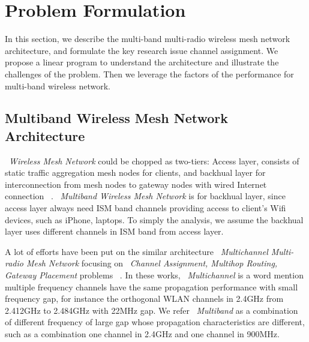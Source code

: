\section{Problem Formulation}
\label{sec:problemformulation}


In this section, we describe the multi-band multi-radio wireless mesh network architecture, and formulate the key research issue channel assignment. 
We propose a linear program to understand the architecture and illustrate the challenges of the problem.
Then we leverage the factors of the performance for multi-band wireless network.
 
\subsection{Multiband Wireless Mesh Network Architecture}
\label{subsec:architecture}
~\emph{Wireless Mesh Network} could be chopped as two-tiers:
Access layer, consists of static traffic aggregation mesh nodes for clients, and backhual layer for interconnection from mesh nodes to gateway nodes with wired Internet connection ~\cite{akyildiz2005wireless}. 
~\emph{Multiband Wireless Mesh Network} is for backhual layer, since access layer always need ISM band channels providing access to client's Wifi devices, such as iPhone, laptops. To simply the analysis, we assume the backhual layer uses different channels in ISM band from access layer.

A lot of efforts have been put on the similar architecture ~\emph{Multichannel Multi-radio Mesh Network} focusing on ~\emph{Channel Assignment, Multihop Routing, Gateway Placement} problems ~\cite{si2010overview}.
In these works, ~\emph{Multichannel} is a word mention multiple frequency channels have the same propagation performance with small frequency gap, for instance the orthogonal WLAN channels in 2.4GHz from 2.412GHz to 2.484GHz with 22MHz gap.
We refer ~\emph{Multiband} as a combination of different frequency of large gap whose propagation characteristics are different, such as a combination one channel in 2.4GHz and one channel in 900MHz.

